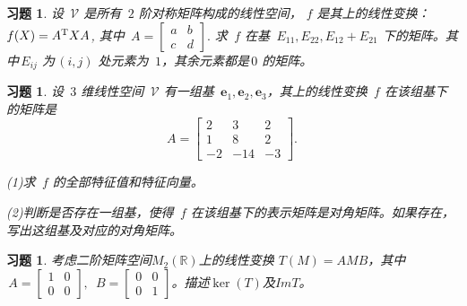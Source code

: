 \documentclass[UTF8]{ctexart}
\newtheorem{ex}[thm]{习题}
\begin{document}
\begin{ex}
	设 $\,\mathcal{V}$ 是所有 $\,2$ 阶对称矩阵构成的线性空间， $f$ 是其上的线性变换：$f(X) = A^{\rm T}XA$, 其中 $\,A = \left[\begin{array}{cc} a & b\\ c& d\end{array}\right].$ 
	求 $\,f$ 在基 $\,E_{11}, E_{22}, E_{12} + E_{21}$ 下的矩阵。其中$\,E_{ij}$ 为$\,(i,j)$ 处元素为 $\,1$，其余元素都是$\,0$ 的矩阵。
\end{ex}




\begin{ex}
	设 $\,3$ 维线性空间 $\,\mathcal{V}$ 有一组基 $\,\boldsymbol{e}_1,  \boldsymbol{e}_2, \boldsymbol{e}_3$，其上的线性变换 $\,f$ 在该组基下的矩阵是
	\[
	A = \left[\begin{array}{ccc} 2 & 3 & 2\\ 1& 8 & 2 \\ -2 & -14 & -3\end{array}\right].
	\]
	
	(1)求 $\,f$ 的全部特征值和特征向量。
	
	(2)判断是否存在一组基，使得 $\,f$ 在该组基下的表示矩阵是对角矩阵。如果存在，写出这组基及对应的对角矩阵。
\end{ex} 






	
\begin{ex}
考虑二阶矩阵空间$M_2(\mathbb{R})$上的线性变换
$T(M)=AMB$，其中$\,A = \left[\begin{array}{cc} 1 & 0\\ 0& 0\end{array}\right],$ $\,B = \left[\begin{array}{cc} 0 & 0\\ 0& 1\end{array}\right]$。描述$\ker (T)$及$Im T$。 
\end{ex}
\end{document}
